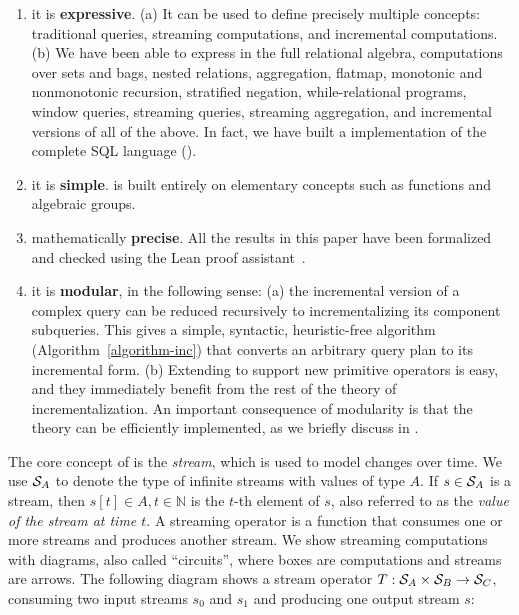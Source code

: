 \begin{enumerate}[nosep, leftmargin=0pt, itemindent=0.5cm, label=\textbf{(\arabic{*})}]
\item it is \textbf{expressive}.  (a) It can be used to define
precisely multiple concepts: traditional queries, streaming computations, and incremental
computations.  (b) We have been able to express in \dbsp the full
relational algebra, computations over sets and bags,
nested relations, aggregation, flatmap, monotonic and nonmonotonic
recursion, stratified negation, while-relational programs, window queries,
streaming queries, streaming aggregation, and incremental versions of all
of the above.  In fact, we have built a \dbsp implementation of the
complete SQL language ().
\item it is \textbf{simple}.
\dbsp is built entirely on elementary concepts such as functions and algebraic groups.
\item mathematically \textbf{precise}.  All the results in this paper have been
formalized and checked using the Lean
proof assistant~\cite{moura-cade15}.
\item it is \textbf{modular}, in the following sense:
(a) the incremental version of a complex query can be reduced
recursively to incrementalizing its component subqueries.
This gives a simple, syntactic,
heuristic-free algorithm (Algorithm~\ref{algorithm-inc})
that converts an arbitrary \dbsp query plan to its incremental form.
(b) Extending \dbsp to support new primitive operators is easy,
and they immediately benefit from the rest of the theory of
incrementalization.
An important consequence of modularity is that the theory
can be efficiently implemented, as we
briefly discuss in .
\end{enumerate}

The core concept of \dbsp is the \emph{stream}, which is used to model changes
over time. We use $\mathcal{S}_{A}$ to denote the type of infinite streams with values of
type $A$. If $s \in \mathcal{S}_{A}$ is a stream,
then $s[t] \in A, t \in \mathbb{N}$ is the $t$-th element of $s$, also referred to as the \emph{value of the stream at time $t$}.
A streaming operator is a function that
consumes one or more streams and produces another stream.  We show
streaming computations with diagrams, also called ``circuits'',
where boxes are computations and streams are arrows.  The following diagram
shows a stream operator $T: \mathcal{S}_{A} \times \mathcal{S}_{B} \to \mathcal{S}_{C}$,
consuming two input streams $s_0$ and $s_1$
and producing one output stream $s$:

